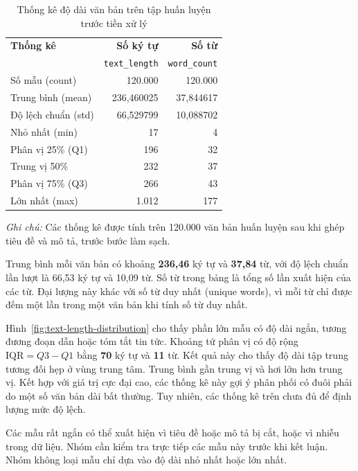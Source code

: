 \documentclass[12pt]{hcmut-report}
\begin{document}
\begin{table}[H]
  \centering
  \caption{Thống kê độ dài văn bản trên tập huấn luyện trước tiền xử lý}
  \label{tab:text-length-statistics}
  \small
  \renewcommand{\arraystretch}{1.15}
  \setlength{\tabcolsep}{18pt}
  \begin{tabular}{lrr}
    \toprule
    \textbf{Thống kê} & \textbf{Số ký tự} & \textbf{Số từ} \\
    & \texttt{text\_length} & \texttt{word\_count} \\
    \midrule
    Số mẫu (count)       & 120.000    & 120.000 \\
    Trung bình (mean)    & 236,460025 & 37,844617 \\
    Độ lệch chuẩn (std)  & 66,529799  & 10,088702 \\
    Nhỏ nhất (min)       & 17         & 4 \\
    Phân vị 25\% (Q1)   & 196        & 32 \\
    Trung vị 50\%       & 232        & 37 \\
    Phân vị 75\% (Q3)   & 266        & 43 \\
    Lớn nhất (max)       & 1.012      & 177 \\
    \bottomrule
  \end{tabular}
  \par\vspace{3pt}
  \parbox{0.82\textwidth}{\footnotesize\textit{Ghi chú:} Các thống kê được tính trên 120.000 văn bản huấn luyện sau khi ghép tiêu đề và mô tả, trước bước làm sạch.}
\end{table}

Trung bình mỗi văn bản có khoảng \textbf{236,46} ký tự và \textbf{37,84} từ, với độ lệch chuẩn lần lượt là 66,53 ký tự và 10,09 từ. Số từ trong bảng là tổng số lần xuất hiện của các từ. Đại lượng này khác với số từ duy nhất (unique words), vì mỗi từ chỉ được đếm một lần trong một văn bản khi tính số từ duy nhất.

Hình~\ref{fig:text-length-distribution} cho thấy phần lớn mẫu có độ dài ngắn, tương đương đoạn dẫn hoặc tóm tắt tin tức. Khoảng tứ phân vị có độ rộng $\mathrm{IQR}=Q3-Q1$ bằng \textbf{70} ký tự và \textbf{11} từ. Kết quả này cho thấy độ dài tập trung tương đối hẹp ở vùng trung tâm. Trung bình gần trung vị và hơi lớn hơn trung vị. Kết hợp với giá trị cực đại cao, các thống kê này gợi ý phân phối có đuôi phải do một số văn bản dài bất thường. Tuy nhiên, các thống kê trên chưa đủ để định lượng mức độ lệch.

Các mẫu rất ngắn có thể xuất hiện vì tiêu đề hoặc mô tả bị cắt, hoặc vì nhiễu trong dữ liệu. Nhóm cần kiểm tra trực tiếp các mẫu này trước khi kết luận. Nhóm không loại mẫu chỉ dựa vào độ dài nhỏ nhất hoặc lớn nhất.
\end{document}
